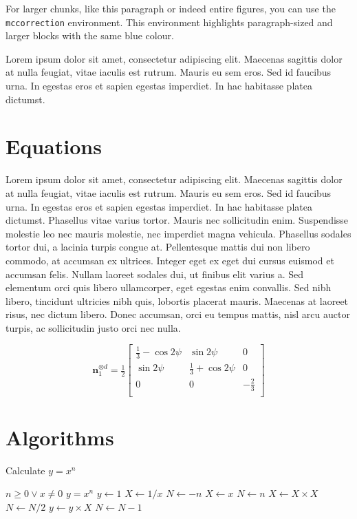 \begin{mccorrection}
For larger chunks, like this paragraph or indeed entire figures, you can use the \verb|mccorrection| environment.  This environment highlights paragraph-sized and larger blocks with the same blue colour.
\end{mccorrection}

Lorem ipsum dolor sit amet, consectetur adipiscing elit. Maecenas sagittis dolor at nulla feugiat, vitae iaculis est rutrum. Mauris eu sem eros. Sed id faucibus urna. In egestas eros et sapien egestas imperdiet. In hac habitasse platea dictumst.

\section{Equations}

Lorem ipsum dolor sit amet, consectetur adipiscing elit. Maecenas sagittis dolor at nulla feugiat, vitae iaculis est rutrum. Mauris eu sem eros. Sed id faucibus urna. In egestas eros et sapien egestas imperdiet. In hac habitasse platea dictumst. Phasellus vitae varius tortor. Mauris nec sollicitudin enim. Suspendisse molestie leo nec mauris molestie, nec imperdiet magna vehicula. Phasellus sodales tortor dui, a lacinia turpis congue at. Pellentesque mattis dui non libero commodo, at accumsan ex ultrices. Integer eget ex eget dui cursus euismod et accumsan felis. Nullam laoreet sodales dui, ut finibus elit varius a. Sed elementum orci quis libero ullamcorper, eget egestas enim convallis. Sed nibh libero, tincidunt ultricies nibh quis, lobortis placerat mauris. Maecenas at laoreet risus, nec dictum libero. Donec accumsan, orci eu tempus mattis, nisl arcu auctor turpis, ac sollicitudin justo orci nec nulla.

\begin{equation}
\boldsymbol{n}^{\otimes d}_1=\tfrac{1}{2}\begin{bmatrix}\tfrac{1}{3}-\cos2\psi & \sin2\psi & 0 \\
\sin2\psi & \tfrac{1}{3}+\cos2\psi & 0 \\
0 & 0 & -\tfrac{2}{3} \\
\end{bmatrix}
\end{equation}


\section{Algorithms}

 \begin{algorithm}
 \caption{Calculate $y = x^n$}
 \label{alg1}
 \begin{algorithmic}
 \REQUIRE $n \geq 0 \vee x \neq 0$
 \ENSURE $y = x^n$
 \STATE $y \leftarrow 1$
 \STATE $X \leftarrow 1 / x$
 \STATE $N \leftarrow -n$
 \ELSE
 \STATE $X \leftarrow x$
 \STATE $N \leftarrow n$
 \ENDIF
 \STATE $X \leftarrow X \times X$
 \STATE $N \leftarrow N / 2$
 \ELSE[$N$ is odd]
 \STATE $y \leftarrow y \times X$
 \STATE $N \leftarrow N - 1$
 \ENDIF
 \ENDWHILE
 \end{algorithmic}
 \end{algorithm}
 
